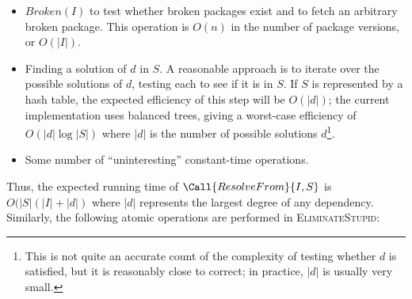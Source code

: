 \documentclass[letterpaper]{article}
\theoremstyle{definition}
\theoremstyle{remark}
\newcommand{\len}[1]{\lvert#1\rvert}
\begin{document}
\begin{itemize}
\item $Broken(I)$ to test whether broken packages exist and to fetch
  an arbitrary broken package.  This operation is $O(n)$ in the number
  of package versions, or $O(\len{I})$.

\item Finding a solution of $d$ in $S$.  A reasonable approach is to
  iterate over the possible solutions of $d$, testing each to see if
  it is in $S$.  If $S$ is represented by a hash table, the expected
  efficiency of this step will be $O(\len{d})$; the current
  implementation uses balanced trees, giving a worst-case efficiency
  of $O(\len{d}\log \len{S})$ where $\len{d}$ is the number of possible
  solutions $d$\footnote{This is not quite an accurate count of the
    complexity of testing whether $d$ is satisfied, but it is
    reasonably close to correct; in practice, $\len{d}$ is usually
    very small.}.

\item Some number of ``uninteresting'' constant-time operations.
\end{itemize}

Thus, the expected running time of $\Call{ResolveFrom}{I,S}$ is
$O(\len{S}(\len{I}+\len{d})$ where $\len{d}$ represents the largest
degree of any dependency.  Similarly, the following atomic operations
are performed in \textsc{EliminateStupid}:
\end{document}
